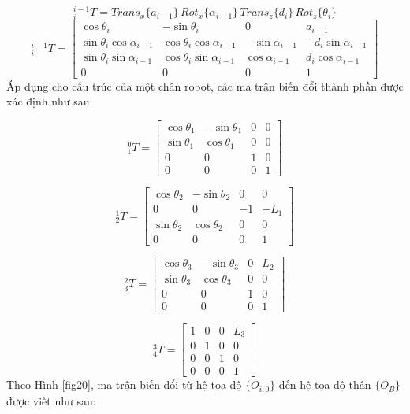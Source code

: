 \begin{equation}
^{i-1}_{i}T = Trans_x\{a_{i-1}\} \, Rot_x\{\alpha_{i-1}\} \, Trans_z\{d_i\} \, Rot_z\{\theta_i\}
\end{equation}
\begin{equation}
{}^{i-1}_{i}T=
\begin{bmatrix}
\cos\theta_i & -\sin\theta_i & 0 & a_{i-1} \\
\sin\theta_i\cos\alpha_{i-1} & \cos\theta_i\cos\alpha_{i-1} & -\sin\alpha_{i-1} & -d_i\sin\alpha_{i-1} \\
\sin\theta_i\sin\alpha_{i-1} & \cos\theta_i\sin\alpha_{i-1} & \cos\alpha_{i-1} & d_i\cos\alpha_{i-1} \\
0 & 0 & 0 & 1
\end{bmatrix}
\end{equation}
Áp dụng cho cấu trúc của một chân robot, các ma trận biến đổi thành phần được xác định như sau:

\begin{equation}
{}^{0}_{1}T=
\begin{bmatrix}
\cos\theta_1 & -\sin\theta_1 & 0 & 0 \\
\sin\theta_1 & \cos\theta_1 & 0 & 0 \\
0 & 0 & 1 & 0 \\
0 & 0 & 0 & 1
\end{bmatrix}
\end{equation}

\begin{equation}
{}^{1}_{2}T=
\begin{bmatrix}
\cos\theta_2 & -\sin\theta_2 & 0 & 0 \\
0 & 0 & -1 & -L_1 \\
\sin\theta_2 & \cos\theta_2 & 0 & 0 \\
0 & 0 & 0 & 1
\end{bmatrix}
\end{equation}

\begin{equation}
{}^{2}_{3}T=
\begin{bmatrix}
\cos\theta_3 & -\sin\theta_3 & 0 & L_2 \\
\sin\theta_3 & \cos\theta_3 & 0 & 0 \\
0 & 0 & 1 & 0 \\
0 & 0 & 0 & 1
\end{bmatrix}
\end{equation}

\begin{equation}
{}^{3}_{4}T=
\begin{bmatrix}
1 & 0 & 0 & L_3 \\
0 & 1 & 0 & 0 \\
0 & 0 & 1 & 0 \\
0 & 0 & 0 & 1
\end{bmatrix}
\end{equation}
Theo Hình \ref{fig20}, ma trận biến đổi từ hệ tọa độ $\{O_{i,0}\}$ đến hệ tọa độ thân $\{O_B\}$ được viết như sau:

